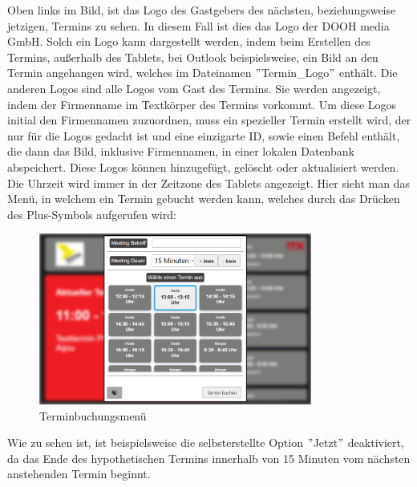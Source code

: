 \justifying
\newline
Oben links im Bild, ist das Logo des Gastgebers des nächsten, beziehungsweise jetzigen, Termins zu sehen.
In diesem Fall ist dies das Logo der DOOH media GmbH\@.
Solch ein Logo kann dargestellt werden, indem beim Erstellen des Termins, außerhalb des Tablets, bei Outlook beispielsweise, ein Bild an den Termin angehangen wird, welches im Dateinamen \("\)Termin\_Logo\("\) enthält.
\newline
Die anderen Logos sind alle Logos vom Gast des Termins.
Sie werden angezeigt, indem der Firmenname im Textkörper des Termins vorkommt.
Um diese Logos initial den Firmennamen zuzuordnen, muss ein spezieller Termin erstellt wird, der nur für die Logos gedacht ist und eine einzigarte ID, sowie einen Befehl enthält, die dann das Bild, inklusive Firmennamen, in einer lokalen Datenbank abspeichert.
Diese Logos können hinzugefügt, gelöscht oder aktualisiert werden.
\newline
Die Uhrzeit wird immer in der Zeitzone des Tablets angezeigt.
\newline
\newline
Hier sieht man das Menü, in welchem ein Termin gebucht werden kann, welches durch das Drücken des Plus-Symbols aufgerufen wird:
\begin{figure}[h]
\par\vspace{1cm}
    \centering
    \includegraphics[width=0.8\textwidth]{Bilder/Ergebnis_TerminErstellen_Menue}
    \caption{Terminbuchungsmenü}
    \label{fig:Menue}
\par\vspace{1cm}
\end{figure}
\justifying
Wie zu sehen ist, ist beispielsweise die selbsterstellte Option \("\)Jetzt\("\) deaktiviert, da das Ende des hypothetischen Termins innerhalb von 15 Minuten vom nächsten anstehenden Termin beginnt.
